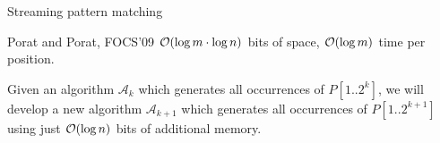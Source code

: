 \begin{frame}{Streaming pattern matching}
    \begin{mylemblock}{Porat and Porat, FOCS'09}
    $\mathcal{O}(\log m\cdot \log n)$ bits of space, $\mathcal{O}(\log m)$ time per position.
    \end{mylemblock}


    \bigskip
     Given an algorithm $\mathcal{A}_{k}$ which generates all occurrences of
    $P[1..2^{k}]$, we will develop a new algorithm
    $\mathcal{A}_{k+1}$ which generates all occurrences of $P[1..2^{k+1}]$ using just $\mathcal{O}(\log n)$ bits of additional memory.
    \pause
    \medskip
    \begin{overlayarea}{\textwidth}{3.5cm}
    \end{overlayarea}
    \end{frame}
    
    
    
